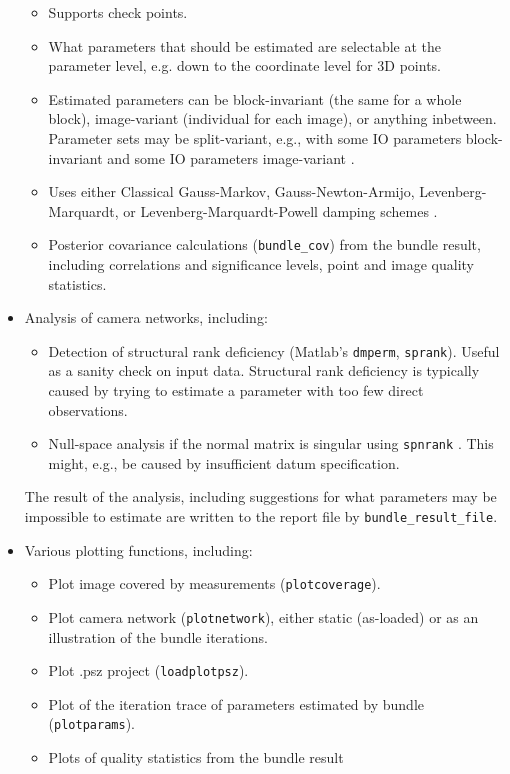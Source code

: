 \documentclass{article}
\begin{document}
\begin{itemize}
\begin{itemize}
\item Supports check points.
\item What parameters that should be estimated are selectable at the
parameter level, e.g. down to the coordinate level for 3D points.
\item Estimated parameters can be block-invariant (the same for a whole
block), image-variant (individual for each image), or anything
inbetween. Parameter sets may be split-variant, e.g., with some IO
parameters block-invariant and some IO parameters image-variant
\citep{Borlin2019:Flexible}.
\item \sloppy Uses either Classical Gauss-Markov, Gauss-Newton-Armijo,
Levenberg-Marquardt, or Levenberg-Marquardt-Powell damping schemes
\citep{Borlin2013:Bundle,Borlin2014:Camera,Borlin2016:External}.
\item Posterior covariance calculations (\texttt{bundle\_cov}) from the bundle
result, including correlations and significance levels, point and
image quality statistics.
\end{itemize}
\item Analysis of camera networks, including:
\begin{itemize}
\item Detection of structural rank deficiency (Matlab's \texttt{dmperm},
\texttt{sprank}). Useful as a sanity check on input data. Structural rank
deficiency is typically caused by trying to estimate a parameter
with too few direct observations.
\item Null-space analysis if the normal matrix is singular using
\texttt{spnrank} \citep{Foster2009:Calculating}. This might, e.g., be
caused by insufficient datum specification.
\end{itemize}
\sloppy The result of the analysis, including suggestions for what
parameters may be impossible to estimate are written to the report
file by \texttt{bundle\_result\_file}.
\item Various plotting functions, including:
\begin{itemize}
\item Plot image covered by measurements (\texttt{plotcoverage}).
\item Plot camera network (\texttt{plotnetwork}), either static (as-loaded) or
as an illustration of the bundle iterations.
\item Plot .psz project (\texttt{loadplotpsz}).
\item Plot of the iteration trace of parameters estimated by bundle
(\texttt{plotparams}).
\item Plots of quality statistics from the bundle result

\end{itemize}
\end{itemize}
\end{document}
